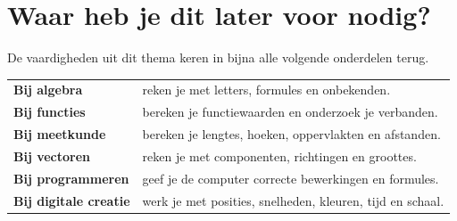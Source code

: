 \documentclass{xourse}
\begin{document}





\section*{Waar heb je dit later voor nodig?}

De vaardigheden uit dit thema keren in bijna alle volgende onderdelen terug.

\begin{center}
\begin{tabular}{p{} p{}}
  \textbf{Bij algebra}
  &
  reken je met letters, formules en onbekenden.
  \\[2mm]

  \textbf{Bij functies}
  &
  bereken je functiewaarden en onderzoek je verbanden.
  \\[2mm]

  \textbf{Bij meetkunde}
  &
  bereken je lengtes, hoeken, oppervlakten en afstanden.
  \\[2mm]

  \textbf{Bij vectoren}
  &
  reken je met componenten, richtingen en groottes.
  \\[2mm]

  \textbf{Bij programmeren}
  &
  geef je de computer correcte bewerkingen en formules.
  \\[2mm]

  \textbf{Bij digitale creatie}
  &
  werk je met posities, snelheden, kleuren, tijd en schaal.
\end{tabular}
\end{center}










\end{document}
